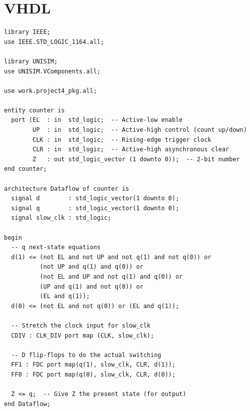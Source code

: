 \documentclass{report}
\begin{document}
\newpage

\section*{VHDL}

\begin{verbatim}
library IEEE;
use IEEE.STD_LOGIC_1164.all;

library UNISIM;
use UNISIM.VComponents.all;

use work.project4_pkg.all;

entity counter is
  port (EL  : in  std_logic;  -- Active-low enable
        UP  : in  std_logic;  -- Active-high control (count up/down)
        CLK : in  std_logic;  -- Rising-edge trigger clock
        CLR : in  std_logic;  -- Active-high asynchronous clear
        Z   : out std_logic_vector (1 downto 0));  -- 2-bit number
end counter;

architecture Dataflow of counter is
  signal d        : std_logic_vector(1 downto 0);
  signal q        : std_logic_vector(1 downto 0);
  signal slow_clk : std_logic;

begin
  -- q next-state equations
  d(1) <= (not EL and not UP and not q(1) and not q(0)) or
          (not UP and q(1) and q(0)) or
          (not EL and UP and not q(1) and q(0)) or
          (UP and q(1) and not q(0)) or
          (EL and q(1));
  d(0) <= (not EL and not q(0)) or (EL and q(1));

  -- Stretch the clock input for slow_clk
  CDIV : CLK_DIV port map (CLK, slow_clk);

  -- D flip-flops to do the actual switching
  FF1 : FDC port map(q(1), slow_clk, CLR, d(1));
  FF0 : FDC port map(q(0), slow_clk, CLR, d(0));

  Z <= q;  -- Give Z the present state (for output)
end Dataflow;
\end{verbatim}
\end{document}

